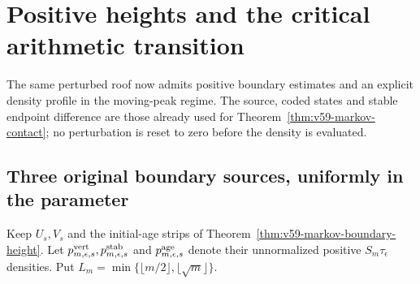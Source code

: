 \section{Positive heights and the critical arithmetic transition}
\label{sec:v60-heights-contact}
The same perturbed roof now admits positive boundary estimates and an
explicit density profile in the moving-peak regime. The source, coded
states and stable endpoint difference are those already used for
Theorem~\ref{thm:v59-markov-contact}; no perturbation is reset to zero
before the density is evaluated.

\subsection{Three original boundary sources, uniformly in the parameter}
Keep $U_s,V_s$ and the initial-age strips of
Theorem~\ref{thm:v59-markov-boundary-height}. Let
$p_{m,\epsilon,s}^{\rm vert},p_{m,\epsilon,s}^{\rm stab}$ and
$p_{m,\epsilon,s}^{\rm age}$ denote their unnormalized positive
$S_m\tau_\epsilon$ densities. Put
$L_m=\min\{\lfloor m/2\rfloor,\lfloor\sqrt m\rfloor\}$.

